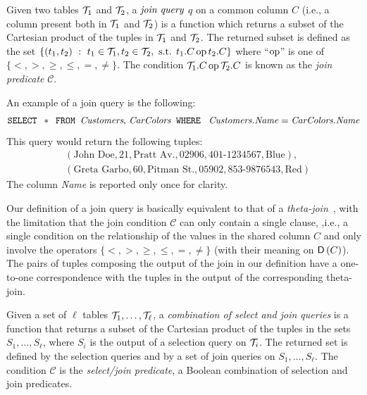 \begin{definition}\label{def:joinquery}
  Given two tables ${\cal T}_1$ and ${\cal T}_2$, a $\emph{join query}$ $q$ on a common
  column $C$ (i.e., a column present both in ${\cal T}_1$ and ${\cal T}_2$) is a
  function which returns a subset of the Cartesian product of the tuples in
  ${\cal T}_1$ and ${\cal T}_2$. The returned subset is defined as the set $ \{(t_1,t_2)
  ~:~ t_1\in{\cal T}_1, t_2\in{\cal T}_2, \mbox{ s.t. } t_1.C \operatorname{op} t_2.C \}$ where
  ``$\operatorname{op}$'' is one of $\{<,>,\ge,\le,=,\neq\}$.
  The condition ${\cal T}_1.C \operatorname{op} {\cal T}_2.C$ is known as the \emph{join predicate}
  $\mathcal{C}$.
\end{definition}
An example of a join query is the following:
\[
\mbox{\texttt{SELECT }} * \mbox{\texttt{ FROM }} \mbox{\emph{Customers}, \emph{CarColors}} \mbox{\texttt{ WHERE }} \mbox{ 
\emph{Customers.Name}} = \mbox{\emph{CarColors.Name}}
\]
This query would return the following tuples:
\begin{align*}
  &(\mbox{John Doe}, 21, \mbox{Pratt Av.}, \mbox{02906}, \mbox{401-1234567}, \mbox{Blue}), \\
  &(\mbox{Greta Garbo}, 60, \mbox{Pitman St.}, \mbox{05902}, \mbox{853-9876543}, \mbox{Red})
\end{align*}
The column \emph{Name} is reported only once for clarity.

Our definition of a join query is basically equivalent to that of a
\emph{theta-join}~\citep[Sect.5.2.7]{GarciaMolinaUW02}, with the limitation that
the join condition $\mathcal{C}$ can only contain a single clause, ,i.e., a single
condition on the relationship of the values in the shared column $C$ and only
involve the operators $\{<,>,\ge,\le,=,\neq\}$ (with their meaning on
$\mathsf{D}\left(C\right)$). The pairs of tuples composing the output of the join in our
definition have a one-to-one correspondence with the tuples in the output of the
corresponding theta-join.

\begin{definition}\label{def:general query}
  Given a set of $\ell$ tables ${\cal T}_1,\dotsc,{\cal T}_\ell$, a \emph{combination of
  select and join queries} is a function that returns a subset of the Cartesian
  product of the tuples in the sets $S_1,\dotsc,S_\ell$, where $S_i$ is the
  output of a selection query on ${\cal T}_i$. The returned set is defined by the
  selection queries and by a set of join queries on $S_1,\dotsc,S_\ell$.
 The condition $\mathcal{C}$ is the \emph{select/join predicate}, a Boolean combination
  of selection and join predicates.
\end{definition}

